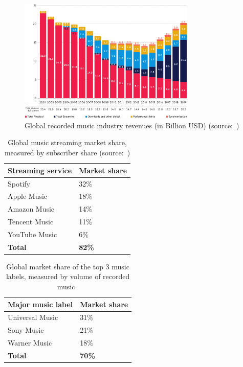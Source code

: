 \begin{figure}
    \centering
    \includegraphics[width=0.75\textwidth]{problem-description/music-industry-revenues-ipfi2020.png}
    \caption{Global recorded music industry revenues (in Billion USD) (source:~\cite{ifpi2020global})}
    \label{fig:music-industry-revenues}
\end{figure}

\begin{table}[]
\begin{tabular}{|l|l|}
\hline
\textbf{Streaming service} & \textbf{Market share} \\ \hline
Spotify                    & 32\%                  \\ \hline
Apple Music                & 18\%                  \\ \hline
Amazon Music               & 14\%                  \\ \hline
Tencent Music              & 11\%                  \\ \hline
YouTube Music              & 6\%                   \\ \hline
\textbf{Total}             & \textbf{82\%}         \\ \hline
\end{tabular}
\caption{Global music streaming market share, measured by subscriber share (source:~\cite{midiamarketshare2020})}
\label{tab:streaming-service-market-share}
\end{table}

\begin{table}[]
\begin{tabular}{|l|l|}
\hline
\textbf{Major music label} & \textbf{Market share} \\ \hline
Universal Music                    & 31\%                  \\ \hline
Sony Music                & 21\%                  \\ \hline
Warner Music               & 18\%                  \\ \hline
\textbf{Total}             & \textbf{70\%}         \\ \hline
\end{tabular}
\caption{Global market share of the top 3 music labels, measured by volume of recorded music~\citep{midiamarketshare2020}}
\label{tab:music-labels-market-share}
\end{table}

